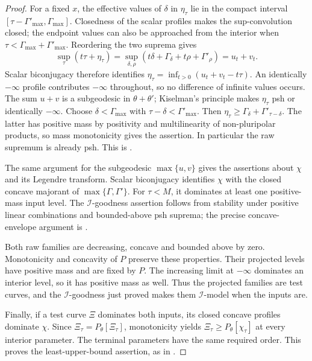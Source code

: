 \begin{proof}
For a fixed $x$, the effective values of $\delta$ in $\eta_\tau$
lie in the compact interval
$[\tau-\Gamma'_{\max},\Gamma_{\max}]$.
Closedness of the scalar profiles makes the sup-convolution
closed; the endpoint values can also be approached from the
interior when $\tau<\Gamma_{\max}+\Gamma'_{\max}$.
Reordering the two suprema gives
\[
 \sup_\tau(t\tau+\eta_\tau)
 =\sup_{\delta,\rho}
       (t\delta+\Gamma_\delta+t\rho+\Gamma'_\rho)
 =u_t+v_t.
\]
Scalar biconjugacy therefore identifies
$\eta_\tau=\inf_{t>0}(u_t+v_t-t\tau)$.
An identically $-\infty$ profile contributes $-\infty$ throughout,
so no difference of infinite values occurs.
The sum $u+v$ is a subgeodesic in $\theta+\theta'$; Kiselman's
principle makes $\eta_\tau$ psh or identically $-\infty$.
Choose $\delta<\Gamma_{\max}$ with
$\tau-\delta<\Gamma'_{\max}$.
Then $\eta_\tau\geq\Gamma_\delta+\Gamma'_{\tau-\delta}$.
The latter has positive mass by positivity and multilinearity of
non-pluripolar products, so mass monotonicity gives the assertion.
In particular the raw supremum is already psh.
This is \cite[Lemma~9.4.2]{XiaBook}.

The same argument for the subgeodesic $\max\{u,v\}$ gives the
assertions about $\chi$ and its Legendre transform.
Scalar biconjugacy identifies $\chi$ with the closed concave
majorant of $\max\{\Gamma,\Gamma'\}$.
For $\tau<M$, it dominates at least one positive-mass input level.
The $\mathcal I$-goodness assertion follows from stability under
positive linear combinations and bounded-above psh suprema;
the precise concave-envelope argument is
\cite[Lemma~9.4.4]{XiaBook}.

Both raw families are decreasing, concave and bounded above by zero.
Monotonicity and concavity of $P$ preserve these properties.
Their projected levels have positive mass and are fixed by $P$.
The increasing limit at $-\infty$ dominates an interior level,
so it has positive mass as well.
Thus the projected families are test curves, and the
$\mathcal I$-goodness just proved makes them $\mathcal I$-model
when the inputs are.

Finally, if a test curve $\Xi$ dominates both inputs, its closed
concave profiles dominate $\chi$.
Since $\Xi_\tau=P_\theta[\Xi_\tau]$, monotonicity yields
$\Xi_\tau\geq P_\theta[\chi_\tau]$ at every interior parameter.
The terminal parameters have the same required order.
This proves the least-upper-bound assertion, as in
\cite[Corollary~9.4.1]{XiaBook}.
\end{proof}

